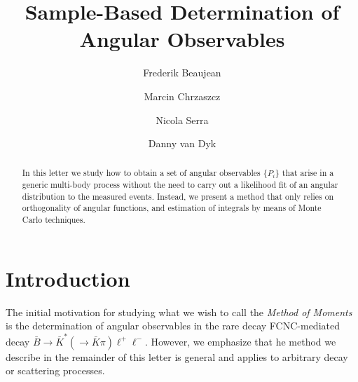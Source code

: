 \documentclass[aps,prd,reprint,nofootinbib,preprintnumbers]{revtex4}
\begin{document}
\allowdisplaybreaks

\title{Sample-Based Determination of Angular Observables}
\author{Frederik Beaujean}
\author{Marcin Chrzaszcz}
\author{Nicola Serra}
\author{Danny van Dyk}

\begin{abstract}
In this letter we study how to obtain a set of angular observables
$\{P_i\}$ that arise in a generic multi-body process without the need
to carry out a likelihood fit of an angular distribution to the
measured events. Instead, we present a method that only relies on
orthogonality of angular functions, and estimation of integrals
by means of Monte Carlo techniques.
\end{abstract}

\maketitle

\section{Introduction}
\label{sec:intro}

The initial motivation for studying what we wish to call the \emph{Method of Moments}
is the determination of angular observables in the rare decay FCNC-mediated decay
$\bar{B}\to \bar{K}^*(\to \bar{K}\pi)\ell^+\ell^-$. However, we emphasize that
he method we describe in the remainder of this letter is general and applies to arbitrary
decay or scattering processes.\\
\end{document}
